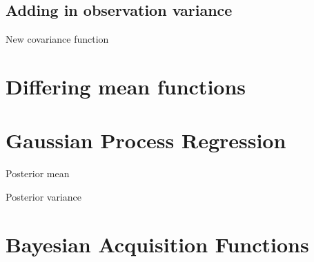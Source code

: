 \begin{figure}
\end{figure}




\subsection*{Adding in observation variance}

\begin{figure}
\end{figure}

New covariance function

\section{Differing mean functions}



\begin{figure}
\end{figure}


\section{Gaussian Process Regression}

Posterior mean

Posterior variance

\section{Bayesian Acquisition Functions}

